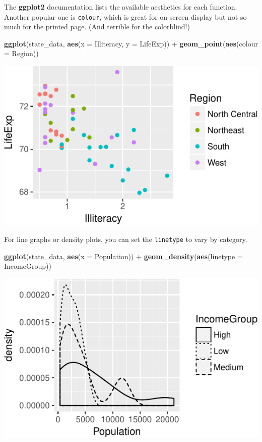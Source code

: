 \documentclass[12pt,oneside,openany]{book}
\newenvironment{Shaded}{\begin{snugshade}}{\end{snugshade}}
\newcommand{\KeywordTok}[1]{\textcolor[rgb]{0.13,0.29,0.53}{\textbf{{#1}}}}
\newcommand{\DataTypeTok}[1]{\textcolor[rgb]{0.13,0.29,0.53}{{#1}}}
\newcommand{\StringTok}[1]{\textcolor[rgb]{0.31,0.60,0.02}{{#1}}}
\newcommand{\NormalTok}[1]{{#1}}
\begin{document}
The \textbf{ggplot2} documentation lists the available aesthetics for
each function. Another popular one is \texttt{colour}, which is great
for on-screen display but not so much for the printed page. (And
terrible for the colorblind!)

\begin{Shaded}
\begin{Highlighting}[]
\KeywordTok{ggplot}\NormalTok{(state_data, }\KeywordTok{aes}\NormalTok{(}\DataTypeTok{x =} \NormalTok{Illiteracy, }\DataTypeTok{y =} \NormalTok{LifeExp)) +}
\StringTok{  }\KeywordTok{geom_point}\NormalTok{(}\KeywordTok{aes}\NormalTok{(}\DataTypeTok{colour =} \NormalTok{Region))}
\end{Highlighting}
\end{Shaded}

\includegraphics{pdaps_files/figure-latex/aes-colour-1.pdf}

For line graphs or density plots, you can set the \texttt{linetype} to
vary by category.

\begin{Shaded}
\begin{Highlighting}[]
\KeywordTok{ggplot}\NormalTok{(state_data, }\KeywordTok{aes}\NormalTok{(}\DataTypeTok{x =} \NormalTok{Population)) +}
\StringTok{  }\KeywordTok{geom_density}\NormalTok{(}\KeywordTok{aes}\NormalTok{(}\DataTypeTok{linetype =} \NormalTok{IncomeGroup))}
\end{Highlighting}
\end{Shaded}

\includegraphics{pdaps_files/figure-latex/aes-linetype-1.pdf}
\end{document}
